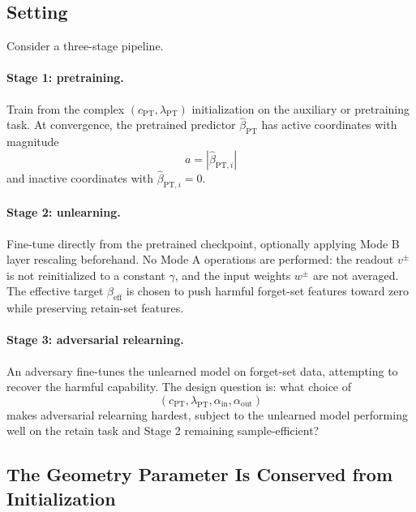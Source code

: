 \documentclass[11pt]{article}
\begin{document}
\subsection{Setting}

Consider a three-stage pipeline.

\paragraph{Stage 1: pretraining.}
Train from the complex \((c_{\mathrm{PT}},\lambda_{\mathrm{PT}})\) initialization on the auxiliary or pretraining task. At convergence, the pretrained predictor \(\widehat\beta_{\mathrm{PT}}\) has active coordinates with magnitude
\begin{equation}
    a=|\widehat\beta_{\mathrm{PT},i}|
\end{equation}
and inactive coordinates with \(\widehat\beta_{\mathrm{PT},i}=0\).

\paragraph{Stage 2: unlearning.}
Fine-tune directly from the pretrained checkpoint, optionally applying Mode B layer rescaling beforehand. No Mode A operations are performed: the readout \(v^\pm\) is not reinitialized to a constant \(\gamma\), and the input weights \(w^\pm\) are not averaged. The effective target \(\beta_{\mathrm{eff}}\) is chosen to push harmful forget-set features toward zero while preserving retain-set features.

\paragraph{Stage 3: adversarial relearning.}
An adversary fine-tunes the unlearned model on forget-set data, attempting to recover the harmful capability. The design question is: what choice of
\begin{equation}
    (c_{\mathrm{PT}},\lambda_{\mathrm{PT}},\alpha_{\mathrm{in}},\alpha_{\mathrm{out}})
\end{equation}
makes adversarial relearning hardest, subject to the unlearned model performing well on the retain task and Stage 2 remaining sample-efficient?

\subsection{The Geometry Parameter Is Conserved from Initialization}
\end{document}
